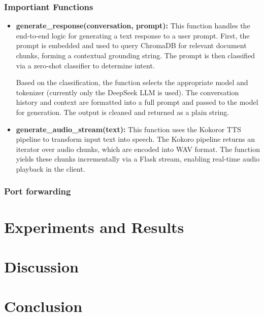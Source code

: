 \documentclass[twocolumn]{article}
\begin{document}
\subsubsection{Importiant Functions}
\label{sec:functions}
\begin{itemize}
    \item \textbf{generate\_response(conversation, prompt):} This function handles the end-to-end logic for generating a text response to a user prompt. First, the prompt is embedded and used to query ChromaDB for relevant document chunks, forming a contextual grounding string. The prompt is then classified via a zero-shot classifier to determine intent.

    Based on the classification, the function selects the appropriate model and tokenizer (currently only the DeepSeek LLM is used). The conversation history and context are formatted into a full prompt and passed to the model for generation. The output is cleaned and returned as a plain string.
    \item \textbf{generate\_audio\_stream(text):} This function uses the Kokoror TTS pipeline to transform input text into speech. The Kokoro pipeline returns an iterator over audio chunks, which are encoded into WAV format. The function yields these chunks incrementally via a Flask stream, enabling real-time audio playback in the client.
\end{itemize}

\subsubsection{Port forwarding}

\section{Experiments and Results}


\section{Discussion}

\section{Conclusion}


\subsubsection{}


\end{document}
